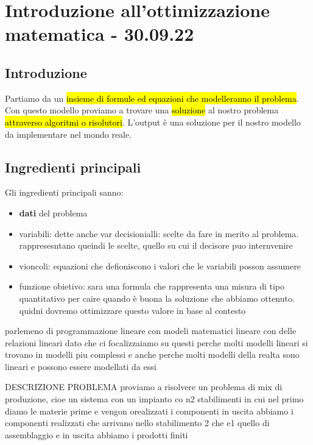 \section{Introduzione all'ottimizzazione matematica - 30.09.22}

\subsection{Introduzione}

Partiamo da un \hl{insieme di formule ed equazioni che modelleranno il problema}. Con questo modello proviamo a trovare una \hl{soluzione} al nostro problema \hl{attraverso algoritmi o risolutori}. L'output è una soluzione per il nostro modello da implementare nel mondo reale.


\subsection{Ingredienti principali}

Gli ingredienti principali sanno:

\begin{itemize}
	\item \textbf{dati} del problema
	\item variabili: dette anche var decisionialli: scelte da fare in merito al problema. rappresesntano queindi le scelte, quello su cui il decisore puo internvenire
	\item vioncoli: equazioni che defioniscono i valori che le variabili posson assumere
	\item funzione obietivo: sara una formula che rappresenta una misura di tipo quantitativo per caire quando è buona la soluzione che abbiamo ottenuto. quidni dovremo ottimizzare questo valore in base al contesto
\end{itemize}



parlemeno di programmazione lineare con modeli matematici lineare con delle relazioni lineari dato che ci focalizzaiamo su questi perche molti modelli lineari si trovano in modelli piu complessi e anche perche molti modelli della realta sono lineari e possono essere modellati da essi


DESCRIZIONE PROBLEMA
proviamo a risolvere un problema di mix di produzione, cioe un sistema con un impianto co n2 stabilimenti in cui nel primo diamo le materie prime e vengon orealizzati i componenti in uscita abbiamo i componenti realizzati che arrivano nello stabilimento 2 che e1 quello di assemblaggio e in uscita abbiamo i prodotti finiti


